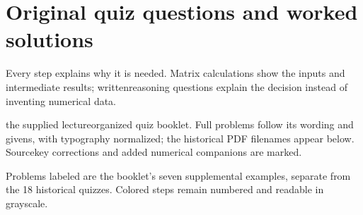 \documentclass[letterpaper,11pt,english,openany,oneside]{jupyterBook}
\begin{document}
\sphinxstepscope


\section{Original quiz questions and worked solutions}
\label{\detokenize{lectures/lecture03/quiz-workbook:original-quiz-questions-and-worked-solutions}}\label{\detokenize{lectures/lecture03/quiz-workbook:lec03-quiz-workbook}}\label{\detokenize{lectures/lecture03/quiz-workbook::doc}}
\sphinxAtStartPar
{} Every step explains why it is needed. Matrix calculations show the inputs and intermediate results; written\sphinxhyphen{}reasoning questions explain the decision instead of inventing numerical data.

\sphinxAtStartPar
{} the supplied lecture\sphinxhyphen{}organized quiz booklet. Full problems follow its wording and givens, with typography normalized; the historical PDF filenames appear below. Source\sphinxhyphen{}key corrections and added numerical companions are marked.

\sphinxAtStartPar
{} Problems labeled  are the booklet’s seven supplemental examples, separate from the 18 historical quizzes. Colored steps remain numbered and readable in grayscale.
\end{document}
